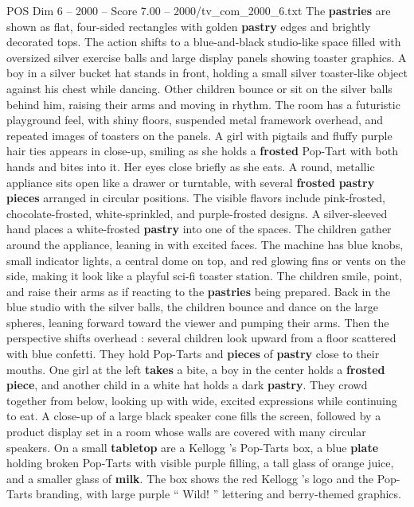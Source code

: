 \begin{textsample}{POS Dim 6 – 2000 – Score 7.00 – 2000/tv\_com\_2000\_6.txt}
The \textbf{pastries} are shown as flat, four-sided rectangles with golden \textbf{pastry} edges and brightly decorated tops.
The action shifts to a blue-and-black studio-like space filled with oversized silver exercise balls and large display panels showing toaster graphics.
A boy in a silver bucket hat stands in front, holding a small silver toaster-like object against his chest while dancing.
Other children bounce or sit on the silver balls behind him, raising their arms and moving in rhythm.
The room has a futuristic playground feel, with shiny floors, suspended metal framework overhead, and repeated images of toasters on the panels.
A girl with pigtails and fluffy purple hair ties appears in close-up, smiling as she holds a \textbf{frosted} Pop-Tart with both hands and bites into it.
Her eyes close briefly as she eats.
A round, metallic appliance sits open like a drawer or turntable, with several \textbf{frosted} \textbf{pastry} \textbf{pieces} arranged in circular positions.
The visible flavors include pink-frosted, chocolate-frosted, white-sprinkled, and purple-frosted designs.
A silver-sleeved hand places a white-frosted \textbf{pastry} into one of the spaces.
The children gather around the appliance, leaning in with excited faces.
The machine has blue knobs, small indicator lights, a central dome on top, and red glowing fins or vents on the side, making it look like a playful sci-fi toaster station.
The children smile, point, and raise their arms as if reacting to the \textbf{pastries} being prepared.
Back in the blue studio with the silver balls, the children bounce and dance on the large spheres, leaning forward toward the viewer and pumping their arms.
Then the perspective shifts overhead : several children look upward from a floor scattered with blue confetti.
They hold Pop-Tarts and \textbf{pieces} of \textbf{pastry} close to their mouths.
One girl at the left \textbf{takes} a bite, a boy in the center holds a \textbf{frosted} \textbf{piece}, and another child in a white hat holds a dark \textbf{pastry}.
They crowd together from below, looking up with wide, excited expressions while continuing to eat.
A close-up of a large black speaker cone fills the screen, followed by a product display set in a room whose walls are covered with many circular speakers.
On a small \textbf{tabletop} are a Kellogg ’s Pop-Tarts box, a blue \textbf{plate} holding broken Pop-Tarts with visible purple filling, a tall glass of orange juice, and a smaller glass of \textbf{milk}.
The box shows the red Kellogg ’s logo and the Pop-Tarts branding, with large purple “ Wild! ” lettering and berry-themed graphics.

\end{textsample}
